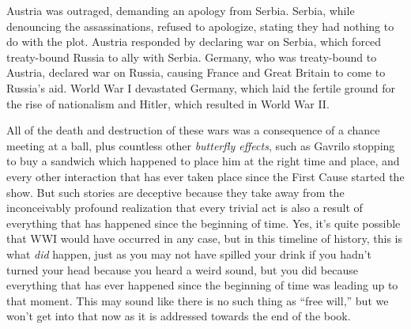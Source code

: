 \documentclass[
]{article}
\begin{document}
Austria was outraged, demanding an apology from Serbia. Serbia, while
denouncing the assassinations, refused to apologize, stating they had
nothing to do with the plot. Austria responded by declaring war on
Serbia, which forced treaty-bound Russia to ally with Serbia. Germany,
who was treaty-bound to Austria, declared war on Russia, causing France
and Great Britain to come to Russia's aid. World War I devastated
Germany, which laid the fertile ground for the rise of nationalism and
Hitler, which resulted in World War II.

All of the death and destruction of these wars was a consequence of a
chance meeting at a ball, plus countless other \emph{butterfly effects},
such as Gavrilo stopping to buy a sandwich which happened to place him
at the right time and place, and every other interaction that has ever
taken place since the First Cause started the show. But such stories are
deceptive because they take away from the inconceivably profound
realization that every trivial act is also a result of everything that
has happened since the beginning of time. Yes, it's quite possible that
WWI would have occurred in any case, but in this timeline of history,
this is what \emph{did} happen, just as you may not have spilled your
drink if you hadn't turned your head because you heard a weird sound,
but you did because everything that has ever happened since the
beginning of time was leading up to that moment. This may sound like
there is no such thing as ``free will,'' but we won't get into that now
as it is addressed towards the end of the book.
\end{document}
